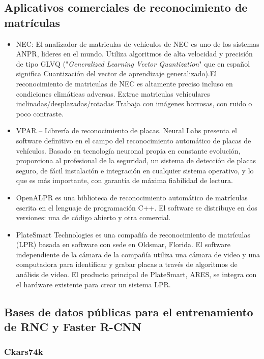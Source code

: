 \subsection{Aplicativos comerciales de reconocimiento de matrículas}

\begin{itemize}
    \item NEC: El analizador de matriculas de vehículos de NEC es uno de los sistemas ANPR, lideres en el mundo. Utiliza algoritmos de alta velocidad y precisión de tipo GLVQ ("\textit{Generalized Learning Vector Quantization}" que en español significa  Cuantización del vector de aprendizaje generalizado).El reconocimiento de matriculas de NEC es altamente preciso incluso en condiciones climáticas adversas. Extrae matriculas vehiculares inclinadas/desplazadas/rotadas Trabaja con imágenes borrosas, con ruido o poco contraste\cite{SoftwareNEC}.
    \item VPAR – Librería de reconocimiento de placas. Neural Labs presenta el software definitivo en el campo del reconocimiento automático de placas de vehículos. Basado en tecnología neuronal propia en constante evolución, proporciona al profesional de la seguridad, un sistema de detección de placas seguro, de fácil instalación e integración en cualquier sistema operativo, y lo que es más importante, con garantía de máxima fiabilidad de lectura\cite{SoftwareVPAR}.
    \item OpenALPR es una biblioteca de reconocimiento automático de matrículas escrita en el lenguaje de programación C++. El software se distribuye en dos versiones: una de código abierto y otra comercial\cite{SoftwareOpen}.
    \item PlateSmart Technologies es una compañía de reconocimiento de matrículas (LPR) basada en software con sede en Oldsmar, Florida. El software independiente de la cámara de la compañía utiliza una cámara de video y una computadora para identificar y grabar placas a través de algoritmos de análisis de video. El producto principal de PlateSmart, ARES, se integra con el hardware existente para crear un sistema LPR\cite{softwarePlateSmart}.
\end{itemize}

\subsection{Bases de datos públicas para el entrenamiento de RNC y Faster R-CNN}

\subsubsection{Ckars74k}\label{Chars74k}

